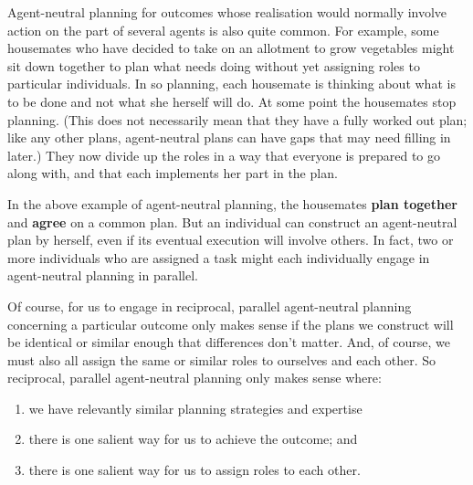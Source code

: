\documentclass[12pt,\papersize]{extarticle}
\begin{document}

Agent-neutral planning for outcomes whose realisation would normally involve action on the part of several agents is also quite common.
For example, some housemates who have decided to take on an allotment to grow vegetables might sit down together to plan what needs doing without yet assigning roles to particular individuals. 
In so planning, each housemate is thinking about what is to be done and not what she herself will do.  
At some point the housemates stop planning.
(This does not necessarily mean that they have a fully worked out plan; like any other plans, agent-neutral plans can have gaps that may need filling in later.)
They now divide up the roles in a way that everyone is prepared to go along with,
	and that each implements her part in the plan.



In the above example of agent-neutral planning,
	the housemates \textbf{plan together} and \textbf{agree} on a common plan.
But an individual can construct an agent-neutral plan by herself, even if its eventual execution will involve others.
	In fact, two or more individuals who are assigned a task might each individually engage in agent-neutral planning in parallel.
	
Of course, for us to engage in reciprocal, parallel agent-neutral planning concerning a particular outcome only makes sense if the  plans we construct will be identical or similar enough that differences don't matter.
And, of course, we must also all assign the same or similar roles to ourselves and each other.
So reciprocal, parallel agent-neutral planning only makes sense where: 
\begin{enumerate}
\item 	we have relevantly similar planning strategies and expertise
\item there is one salient way for us to achieve the outcome; and
\item there is one salient way for us to assign roles to each other.
\end{enumerate}
\end{document}

